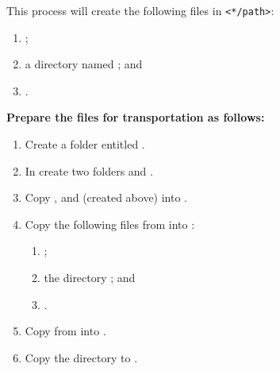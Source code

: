 This process will create the following files in \texttt{<*/path>}:
\begin{enumerate}
\item {};  \item a
directory named ;
and \item {}.
\end{enumerate}

\vspace{2em}

\textbf{Prepare the files for transportation as follows:}
\begin{enumerate} \item Create a folder entitled
. \item In
 create two folders
  and
 .
\item Copy  ,
 and
 (created above)
into . \item Copy the
following files from 
into :
\begin{enumerate}
\item {};
\item the directory
; and
\item {}.
\end{enumerate}
\item Copy  from
into . \item Copy the
directory  to
.
\end{enumerate}

